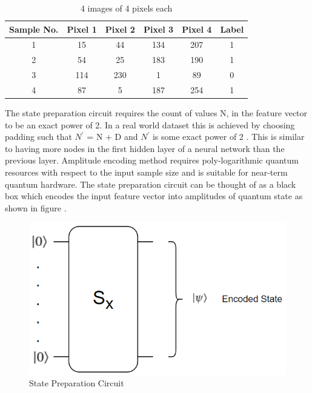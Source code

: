 \documentclass[english,a4paper,11pt,oneside,onecolumn]{book}
\begin{document}
\begin{table}[H]
\begin{center}
\begin{tabular}{|c|c|c|c|c|c|}
\hline
\textbf{Sample No.} & \textbf{Pixel 1} & \textbf{Pixel 2} & \textbf{Pixel 3} & \textbf{Pixel 4} & \textbf{Label} \\
\hline
1 & 15 & 44 & 134 & 207 & 1\\
\hline
2 & 54 & 25 & 183 & 190 & 1\\
\hline
3 & 114 & 230 & 1 & 89 & 0\\
\hline
4 & 87 & 5 & 187 & 254 & 1\\
\hline
\end{tabular}
\end{center}
\caption{4 images of 4 pixels each} 
\label{tab:sampleImages}
\end{table}

The state preparation circuit requires the count of values N, in the feature vector to be an exact power of 2. In a real world dataset this is achieved by choosing padding such that \(N^'\) = N + D and \(N^'\) is some exact power of 2 \cite{schuld_2020_circuitcentric}. This is similar to having more nodes in the first hidden layer of a neural network than the previous layer. Amplitude encoding method requires poly-logarithmic quantum resources with respect to the input sample size and is suitable for near-term quantum hardware. The state preparation circuit can be thought of as a black box which encodes the input feature vector into amplitudes of quantum state as shown in figure .

\begin{figure}[H]
    \centering
    \includegraphics[scale=0.6]{Images/StatePreparationCircuit.PNG}
    \caption{State Preparation Circuit}
    \label{fig:statePrepCirc}
\end{figure}
\end{document}
